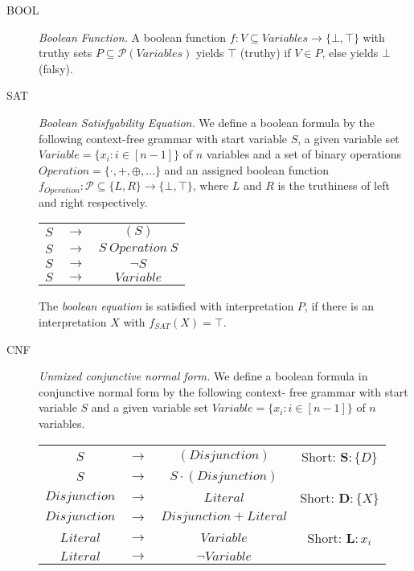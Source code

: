 \documentclass[12pt, letterpaper]{article}
\begin{document}
    \begin{description}
        \item[BOOL] {
            \emph{Boolean Function.}
            A boolean function $f: V \subseteq Variables \rightarrow
            \{\bot, \top\}$ with truthy sets $P \subseteq \mathcal{P}
            (Variables)$ yields $\top$ (truthy) if $V \in P$, else
            yields $\bot$ (falsy).
        }
        \item[SAT] {
            \emph{Boolean Satisfyability Equation.}
            We define a boolean formula by the following context-free
            grammar with start variable $S$, a given variable set
            $Variable = \{x_i : i \in [n-1]\}$ of $n$ variables and a
            set of binary operations $Operation = \{\cdot, +, \oplus,
            \dots\}$ and an assigned boolean function $f_{Operation}
            : \mathcal{P} \subseteq \{L, R\} \rightarrow \{\bot, \top\}$,
            where $L$ and $R$ is the truthiness of left and right 
            respectively.

            \begin{tabular}{ccc}
                $S$ & $\rightarrow$& $(S)$ \\ 
                $S$ & $\rightarrow$& $S\ Operation\ S$ \\ 
                $S$ & $\rightarrow$& $\lnot S$ \\ 
                $S$ & $\rightarrow$& $Variable$ \\ 
            \end{tabular}

            The \emph{boolean equation} is satisfied with interpretation
            $P$, if there is an interpretation $X$ with $f_{SAT}(X) = \top$.
        }
        \item[CNF] {
            \emph{Unmixed conjunctive normal form.} We define a boolean
            formula in conjunctive normal form by the following context-
            free grammar with start variable $S$ and a given variable
            set $Variable = \{x_i : i \in [n-1]\}$ of $n$ variables.

            \begin{tabular}{cccc}
                $S$ & $\rightarrow$& $(Disjunction)$ & \small{Short:} $\mathbf{S}: \{D\}$  \\ 
                $S$ & $\rightarrow$& $S \cdot (Disjunction)$ \\ 
                $Disjunction$ & $\rightarrow$& $Literal$ & \small{Short:} $\mathbf{D}: \{X\}$ \\ 
                $Disjunction$ & $\rightarrow$& $Disjunction + Literal$ \\ 
                $Literal$ & $\rightarrow$& $Variable$ & \small{Short:} $\mathbf{L}: x_i$ \\ 
                $Literal$ & $\rightarrow$& $\lnot Variable$ \\ 
            \end{tabular}

}
\end{description}
\end{document}
